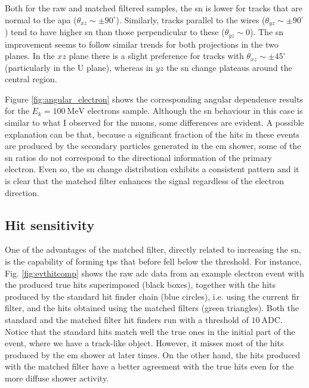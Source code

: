 Both for the raw and matched filtered samples, the \gls{sn} is lower for tracks that are normal to the \gls{apa} ($\theta_{xz} \sim \pm 90^{\circ}$). Similarly, tracks parallel to the wires ($\theta_{yz} \sim \pm 90^{\circ}$) tend to have higher \gls{sn} than those perpendicular to these ($\theta_{yz} \sim 0$). The \gls{sn} improvement seems to follow similar trends for both projections in the two planes. In the $xz$ plane there is a slight preference for tracks with $\theta_{xz} \sim \pm 45^{\circ}$ (particularly in the U plane), whereas in $yz$ the \gls{sn} change plateaus around the central region.

Figure \ref{fig:angular_electron} shows the corresponding angular dependence results for the $E_{k}=100 \ \mathrm{MeV}$ electrons sample. Although the \gls{sn} behaviour in this case is similar to what I observed for the muons, some differences are evident. A possible explanation can be that, because a significant fraction of the hits in these events are produced by the secondary particles generated in the \gls{em} shower, some of the \gls{sn} ratios do not correspond to the directional information of the primary electron. Even so, the \gls{sn} change distribution exhibits a consistent pattern and it is clear that the matched filter enhances the signal regardless of the electron direction.

\subsection{Hit sensitivity}
\label{subsec:2.5.3}

One of the advantages of the matched filter, directly related to increasing the \gls{sn}, is the capability of forming \gls{tp}s that before fell below the threshold. For instance, Fig. \ref{fig:evthitcomp} shows the raw \gls{adc} data from an example electron event with the produced true hits superimposed (black boxes), together with the hits produced by the standard hit finder chain (blue circles), i.e. using the current \gls{fir} filter, and the hits obtained using the matched filters (green triangles). Both the standard and the matched filter hit finders run with a threshold of $10 \ \mathrm{ADC}$. Notice that the standard hits match well the true ones in the initial part of the event, where we have a track-like object. However, it misses most of the hits produced by the \gls{em} shower at later times. On the other hand, the hits produced with the matched filter have a better agreement with the true hits even for the more diffuse shower activity.

